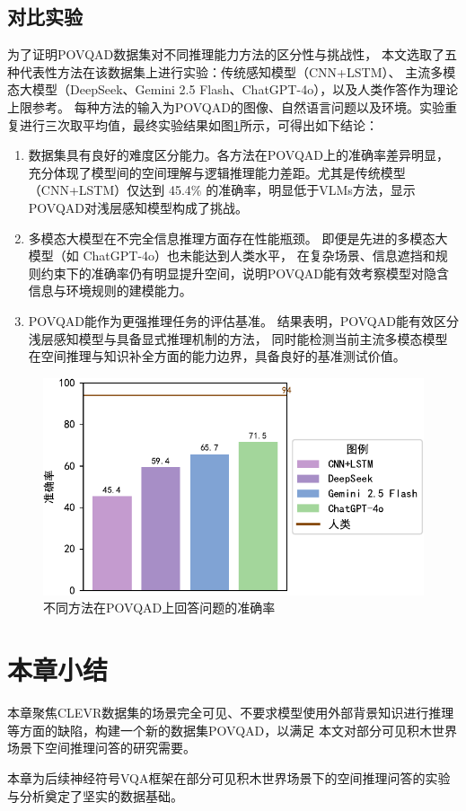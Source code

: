\subsection{对比实验}
为了证明POVQAD数据集对不同推理能力方法的区分性与挑战性，
本文选取了五种代表性方法在该数据集上进行实验：传统感知模型（CNN+LSTM）、
主流多模态大模型（DeepSeek、Gemini 2.5 Flash、ChatGPT-4o），以及人类作答作为理论上限参考。
每种方法的输入为POVQAD的图像、自然语言问题以及环境。实验重复进行三次取平均值，最终实验结果如图\ref{fig:dataset-comparison}所示，可得出如下结论：
\begin{enumerate}[nosep]
\item 数据集具有良好的难度区分能力。各方法在POVQAD上的准确率差异明显，充分体现了模型间的空间理解与逻辑推理能力差距。尤其是传统模型（CNN+LSTM）仅达到 45.4\% 的准确率，明显低于VLMs方法，显示POVQAD对浅层感知模型构成了挑战。
\item 多模态大模型在不完全信息推理方面存在性能瓶颈。
即便是先进的多模态大模型（如 ChatGPT-4o）也未能达到人类水平，
在复杂场景、信息遮挡和规则约束下的准确率仍有明显提升空间，说明POVQAD能有效考察模型对隐含信息与环境规则的建模能力。
\item POVQAD能作为更强推理任务的评估基准。
结果表明，POVQAD能有效区分浅层感知模型与具备显式推理机制的方法，
同时能检测当前主流多模态模型在空间推理与知识补全方面的能力边界，具备良好的基准测试价值。
\end{enumerate}
\begin{figure}[h]
\centering
\includegraphics[scale=0.8]{figures/dataset-experiment-crop.pdf}
\caption{不同方法在POVQAD上回答问题的准确率}
\label{fig:dataset-comparison}
\end{figure}
\section{本章小结}
本章聚焦CLEVR数据集的场景完全可见、不要求模型使用外部背景知识进行推理等方面的缺陷，构建一个新的数据集POVQAD，以满足
本文对部分可见积木世界场景下空间推理问答的研究需要。

本章为后续神经符号VQA框架在部分可见积木世界场景下的空间推理问答的实验与分析奠定了坚实的数据基础。